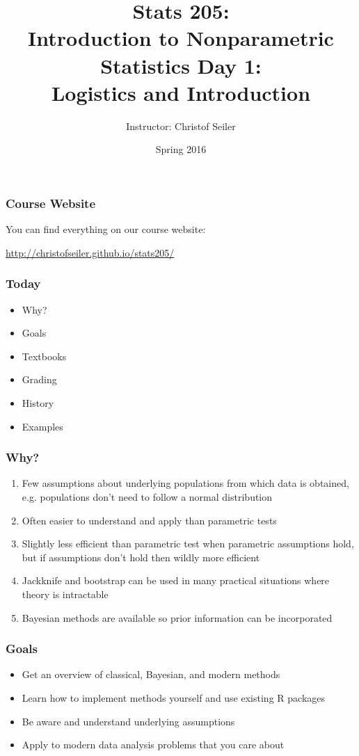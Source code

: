 \documentclass[10pt]{beamer}
\title{\large \bfseries Stats 205: \\ Introduction to Nonparametric Statistics \linebreak \linebreak \linebreak
Day 1: \\ Logistics and Introduction}
\author{Instructor: Christof Seiler}
\date{Spring 2016}
\begin{document}
\frame{
\thispagestyle{empty}
\titlepage
}

\begin{frame}
\frametitle{Course Website}

You can find everything on our course website: \linebreak

\url{http://christofseiler.github.io/stats205/}

\end{frame}

\begin{frame}
\frametitle{Today}

\begin{itemize}
\item Why?
\item Goals
\item Textbooks
\item Grading
\item History
\item Examples
\end{itemize}

\end{frame}

\begin{frame}
\frametitle{Why?}

\begin{enumerate}
\item Few assumptions about underlying populations from which data is obtained, e.g. populations don't need to follow a normal distribution
\item Often easier to understand and apply than parametric tests
\item Slightly less efficient than parametric test when parametric assumptions hold, but if assumptions don't hold then wildly more efficient
\item Jackknife and bootstrap can be used in many practical situations where theory is intractable
\item Bayesian methods are available so prior information can be incorporated
\end{enumerate}

\end{frame}

\begin{frame}
\frametitle{Goals}

\begin{itemize}
\item Get an overview of classical, Bayesian, and modern methods
\item Learn how to implement methods yourself and use existing R packages
\item Be aware and understand underlying assumptions
\item Apply to modern data analysis problems that you care about
\end{itemize}

\end{frame}
\end{document}
